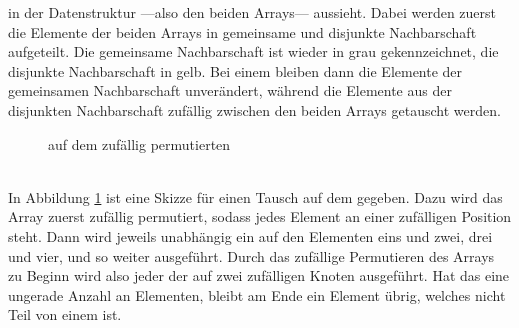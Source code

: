in der Datenstruktur ---also den beiden Arrays--- aussieht. Dabei werden zuerst die Elemente
der beiden Arrays in gemeinsame und disjunkte Nachbarschaft aufgeteilt. Die gemeinsame Nachbarschaft ist
wieder in grau gekennzeichnet, die disjunkte Nachbarschaft in gelb. 
Bei einem \ct{} bleiben dann die Elemente 
der gemeinsamen Nachbarschaft unverändert, während die Elemente aus der 
disjunkten Nachbarschaft zufällig zwischen den beiden 
Arrays getauscht werden.
%
%
% 
\begin{figure}
\centering
  \caption{\gc{} auf dem zufällig permutierten \partvek}
  \label{fig:global_curveball_trade_vector}
  
\end{figure}
%
%
%
\\

In Abbildung \ref{fig:global_curveball_trade_vector} ist eine Skizze für einen \gc{} Tausch
auf dem \partvek{} gegeben.
Dazu wird das Array zuerst zufällig permutiert, sodass jedes Element an einer zufälligen
Position steht.
Dann wird jeweils unabhängig ein \ct{} auf den Elementen eins und zwei, drei und vier, und so weiter ausgeführt.
Durch das zufällige Permutieren des Arrays zu Beginn wird also jeder der  auf zwei zufälligen
Knoten ausgeführt. Hat das \partvek{} eine ungerade Anzahl an Elementen, bleibt am Ende ein Element übrig, 
welches nicht Teil von einem \ct{} ist. 






